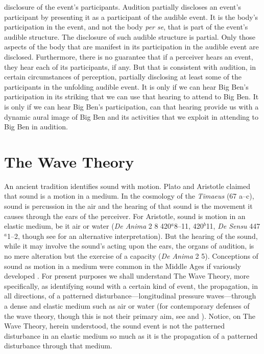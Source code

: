 disclosure of the event's participants. Audition partially discloses an event's participant by presenting it as a participant of the audible event. It is the body's participation in the event, and not the body \emph{per se}, that is part of the event's audible structure. The disclosure of such audible structure is partial. Only those aspects of the body that are manifest in its participation in the audible event are disclosed. Furthermore, there is no guarantee that if a perceiver hears an event, they hear each of its participants, if any. But that is consistent with audition, in certain circumstances of perception, partially disclosing at least some of the participants in the unfolding audible event. It is only if we can hear Big Ben's participation in its striking that we can use that hearing to attend to Big Ben. It is only if we can hear Big Ben's participation, can that hearing provide us with a dynamic aural image of Big Ben and its activities that we exploit in attending to Big Ben in audition.

\section{The Wave Theory} %
\label{sec:the_wave_theory}

An ancient tradition identifies sound with motion. Plato and Aristotle claimed that sound is a motion in a medium. In the cosmology of the \emph{Timaeus} (67 a--c), sound is percussion in the air and the hearing of that sound is the movement it causes through the ears of the perceiver. For Aristotle, sound is motion in an elastic medium, be it air or water (\emph{De Anima} 2 8 420\( ^{a} \)8--11, 420\( ^{b} \)11, \emph{De Sensu} 447\( ^{a} \)1--2, though see \citealt[60--1]{OCallaghan:2007xy} for an alternative interpretation). But the hearing of the sound, while it may involve the sound's acting upon the ears, the organs of audition, is no mere alteration but the exercise of a capacity (\emph{De Anima} 2 5). Conceptions of sound as motion in a medium were common in the Middle Ages if variously developed \citep{Pasnau:2000aa}. For present purposes we shall understand The Wave Theory, more specifically, as identifying sound with a certain kind of event, the propagation, in all directions, of a patterned disturbance---longitudinal pressure waves---through a dense and elastic medium such as air or water (for contemporary defenses of the wave theory, though this is not their primary aim, see \citealt{OShaughnessy:2009aa} and \citealt{Sorensen:2009aa}). Notice, on The Wave Theory, herein understood, the sound event is not the patterned disturbance in an elastic medium so much as it is the propagation of a patterned disturbance through that medium. 


